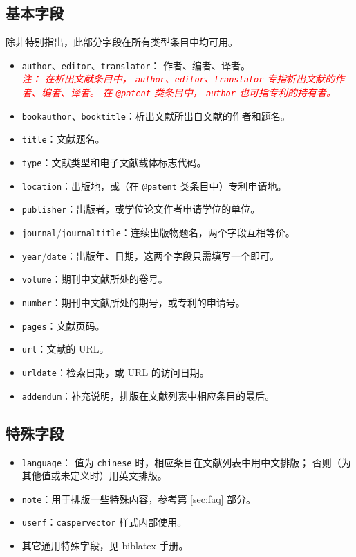 \documentclass[UTF8]{ctexart}
\newcommand{\myemph}[1]{\emph{\textcolor{red}{#1}}}
\begin{document}
\subsection{基本字段}

除非特别指出，此部分字段在所有类型条目中均可用。

\begin{itemize}
	\item \verb|author|、\verb|editor|、\verb|translator|：
		作者、编者、译者。\\
		\myemph{%
			注：
			在析出文献条目中，%
			\texttt{author}、\texttt{editor}、\texttt{translator}
			专指析出文献的作者、编者、译者。
			在 \texttt{@patent} 类条目中，%
			\texttt{author} 也可指专利的持有者。%
		}
	\item \verb|bookauthor|、\verb|booktitle|：析出文献所出自文献的作者和题名。
	\item \verb|title|：文献题名。
	\item \verb|type|：文献类型和电子文献载体标志代码\supercite{gbt7714-2005}。
	\item \verb|location|：出版地，或（在 \verb|@patent| 类条目中）专利申请地。
	\item \verb|publisher|：出版者，或学位论文作者申请学位的单位。
	\item \verb|journal|/\verb|journaltitle|：连续出版物题名，两个字段互相等价。
	\item \verb|year|/\verb|date|：出版年、日期，这两个字段只需填写一个即可。
	\item \verb|volume|：期刊中文献所处的卷号。
	\item \verb|number|：期刊中文献所处的期号，或专利的申请号。
	\item \verb|pages|：文献页码。
	\item \verb|url|：文献的 URL。
	\item \verb|urldate|：检索日期，或 URL 的访问日期。
	\item \verb|addendum|：补充说明，排版在文献列表中相应条目的最后。
\end{itemize}

\subsection{特殊字段}

\begin{itemize}
	\item \verb|language|：
		值为 \verb|chinese| 时，相应条目在文献列表中用中文排版；
		否则（为其他值或未定义时）用英文排版。
	\item \verb|note|：用于排版一些特殊内容，参考第 \ref{sec:faq} 部分。
	\item \verb|userf|：\verb|caspervector| 样式内部使用。
	\item 其它通用特殊字段，见 biblatex 手册\supercite{biblatex}。
\end{itemize}
\end{document}
